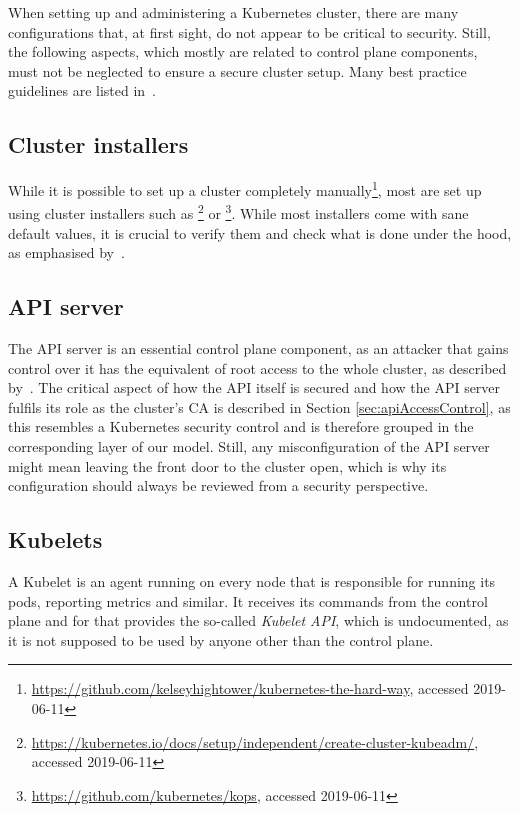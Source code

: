 When setting up and administering a Kubernetes cluster, there are many configurations that, at first sight, do not appear to be critical to security. Still, the following aspects, which mostly are related to control plane components, must not be neglected to ensure a secure cluster setup. Many best practice guidelines are listed in~\textcite{kubernetessecurity}.

\subsection{Cluster installers}

While it is possible to set up a cluster completely manually\footnote{\url{https://github.com/kelseyhightower/kubernetes-the-hard-way}, accessed 2019-06-11}, most are set up using cluster installers such as \footnote{\url{https://kubernetes.io/docs/setup/independent/create-cluster-kubeadm/}, accessed 2019-06-11} or \footnote{\url{https://github.com/kubernetes/kops}, accessed 2019-06-11}. While most installers come with sane default values, it is crucial to verify them and check what is done under the hood, as emphasised by~\textcite{securingkubernetesConfK8SClusterComponents}. 

\subsection{API server}

The API server is an essential control plane component, as an attacker that gains control over it has the equivalent of root access to the whole cluster, as described by~\cite{kubernetessecurity}. The critical aspect of how the API itself is secured and how the API server fulfils its role as the cluster's \ac{CA} is described in Section \ref{sec:apiAccessControl}, as this resembles a Kubernetes security control and is therefore grouped in the corresponding layer of our model. Still, any misconfiguration of the API server might mean leaving the front door to the cluster open, which is why its configuration should always be reviewed from a security perspective.

\subsection{Kubelets}

A Kubelet is an agent running on every node that is responsible for running its pods, reporting metrics and similar. It receives its commands from the control plane and for that provides the so-called \textit{Kubelet API}, which is undocumented, as it is not supposed to be used by anyone other than the control plane. 

